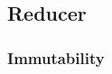 \subsection{Reducer}
\label{ssec:gr-reducer}

\subsubsection{Immutability}
\label{sssec:grr-immutability}

